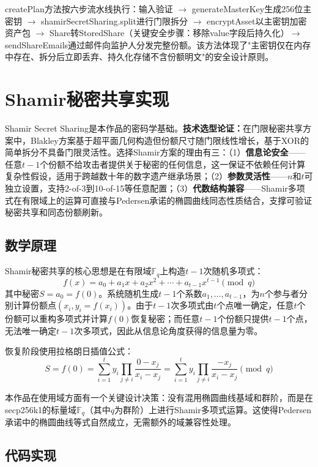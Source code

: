 \documentclass[UTF8,a4paper,zihao=-4,openany]{ctexrep}
\begin{document}
createPlan方法按六步流水线执行：输入验证 $\to$ generateMasterKey生成256位主密钥 $\to$ shamirSecretSharing.split进行门限拆分 $\to$ encryptAsset以主密钥加密资产包 $\to$ Share转StoredShare（关键安全步骤：移除value字段后持久化）$\to$ sendShareEmails通过邮件向监护人分发完整份额。该方法体现了"主密钥仅在内存中存在、拆分后立即丢弃、持久化存储不含份额明文"的安全设计原则。

\section{Shamir秘密共享实现}

Shamir Secret Sharing是本作品的密码学基础。\textbf{技术选型论证：}在门限秘密共享方案中，Blakley方案基于超平面几何构造但份额尺寸随门限线性增长，基于XOR的简单拆分不具备门限灵活性。选择Shamir方案的理由有三：（1）\textbf{信息论安全}——任意$t-1$个份额不给攻击者提供关于秘密的任何信息，这一保证不依赖任何计算复杂性假设，适用于跨越数十年的数字遗产继承场景；（2）\textbf{参数灵活性}——$n$和$t$可独立设置，支持2-of-3到10-of-15等任意配置；（3）\textbf{代数结构兼容}——Shamir多项式在有限域上的运算可直接与Pedersen承诺的椭圆曲线同态性质结合，支撑可验证秘密共享和同态份额刷新。

\subsection{数学原理}

Shamir秘密共享的核心思想是在有限域$\mathbb{F}_q$上构造$t-1$次随机多项式：
\[
f(x)=a_0+a_1x+a_2x^2+\cdots+a_{t-1}x^{t-1}\pmod{q}
\]
其中秘密$S=a_0=f(0)$。系统随机生成$t-1$个系数$a_1,\dots,a_{t-1}$，为$n$个参与者分别计算份额点$(x_i, y_i=f(x_i))$。由于$t-1$次多项式由$t$个点唯一确定，任意$t$个份额可以重构多项式并计算$f(0)$恢复秘密；而任意$t-1$个份额只提供$t-1$个点，无法唯一确定$t-1$次多项式，因此从信息论角度获得的信息量为零。

恢复阶段使用拉格朗日插值公式：
\[
S = f(0) = \sum_{i=1}^{t} y_i \prod_{j \neq i} \frac{0-x_j}{x_i-x_j} = \sum_{i=1}^{t} y_i \prod_{j \neq i} \frac{-x_j}{x_i-x_j} \pmod{q}
\]

本作品在使用域方面有一个关键设计决策：没有混用椭圆曲线基域和群阶，而是在secp256k1的标量域$\mathbb{F}_q$（其中$q$为群阶）上进行Shamir多项式运算。这使得Pedersen承诺中的椭圆曲线等式自然成立，无需额外的域兼容性处理。

\subsection{代码实现}
\end{document}
